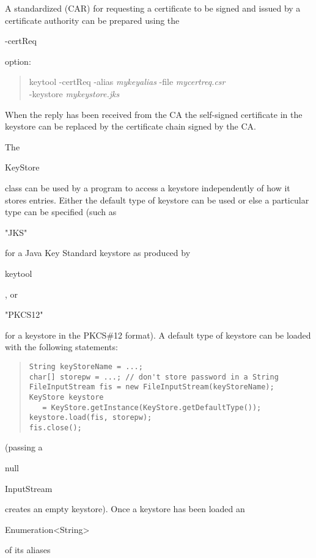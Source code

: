 A standardized  (CAR) for requesting
a certificate to be signed and issued by a certificate authority can be prepared
using the \begin{code}-certReq\end{code} option:
\begin{quote}\begin{code}
keytool -certReq -alias \emph{mykeyalias} -file \emph{mycertreq.csr} \\
\trind  -keystore \emph{mykeystore.jks}
\end{code}\end{quote}
When the reply has been received from the CA the self-signed certificate
in the keystore can be replaced by the certificate chain signed by the CA.

The \begin{code}KeyStore\end{code} class can be used by a program to access
a keystore independently of how it stores entries.
Either the default type of keystore can be used or else a particular type can be specified
(such as \begin{code}"JKS"\end{code} for a Java Key Standard keystore as produced by
\begin{code}keytool\end{code}, or \begin{code}"PKCS12"\end{code} for a keystore
in the PKCS\#12 format).
A default type of keystore can be loaded with the following statements:
\begin{quote}\begin{code}\begin{verbatim}
String keyStoreName = ...;
char[] storepw = ...; // don't store password in a String
FileInputStream fis = new FileInputStream(keyStoreName);
KeyStore keystore
   = KeyStore.getInstance(KeyStore.getDefaultType());
keystore.load(fis, storepw);
fis.close();
\end{verbatim}\end{code}\end{quote}
(passing a \begin{code}null\end{code} \begin{code}InputStream\end{code}
creates an empty keystore).
Once a keystore has been loaded an \begin{code}Enumeration<String>\end{code} of its aliases
